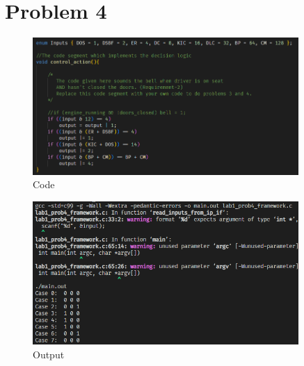 \clearpage
\section*{Problem 4}
\begin{figure}[h!]
    \centering
    \includegraphics[width=0.9\textwidth]{Images/4a Code.png}
    \caption{Code}
\end{figure}

\begin{figure}[h!]
    \centering
    \includegraphics[width=0.9\textwidth]{Images/4a Output.png}
    \caption{Output}
\end{figure}